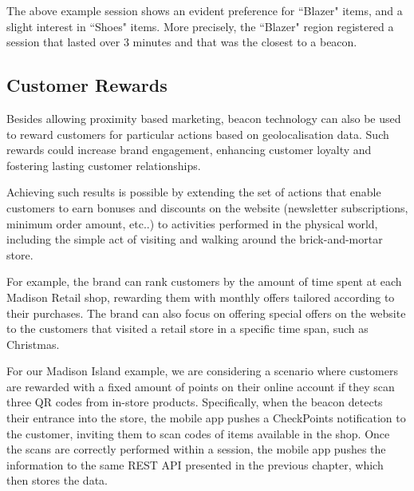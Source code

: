\vspace{0.5cm}


The above example session shows an evident preference for ``Blazer" items, and a slight interest in ``Shoes" items. More precisely, the ``Blazer" region registered a session that lasted over 3 minutes and that was the closest to a beacon.  

\subsection{Customer Rewards}

Besides allowing proximity based marketing, beacon technology can also be used to reward customers for particular actions based on geolocalisation data. Such rewards could increase brand engagement, enhancing customer loyalty and fostering lasting customer relationships. 

Achieving such results is possible by extending the set of actions that enable customers to earn bonuses and discounts on the website (newsletter subscriptions, minimum order amount, etc..) to activities performed in the physical world, including the simple act of visiting and walking around the brick-and-mortar store.

For example, the brand can rank customers by the amount of time spent at each Madison Retail shop, rewarding them with monthly offers tailored according to their purchases. The brand can also focus on offering special offers on the website to the customers that visited a retail store in a specific time span, such as Christmas.

For our Madison Island example, we are considering a scenario where customers are rewarded with a fixed amount of points on their online account if they scan three QR codes from in-store products. Specifically, when the beacon detects their entrance into the store, the mobile app pushes a CheckPoints notification to the customer, inviting them to scan codes of items available in the shop. Once the scans are correctly performed within a session, the mobile app pushes the information to the same REST API presented in the previous chapter, which then stores the data.

